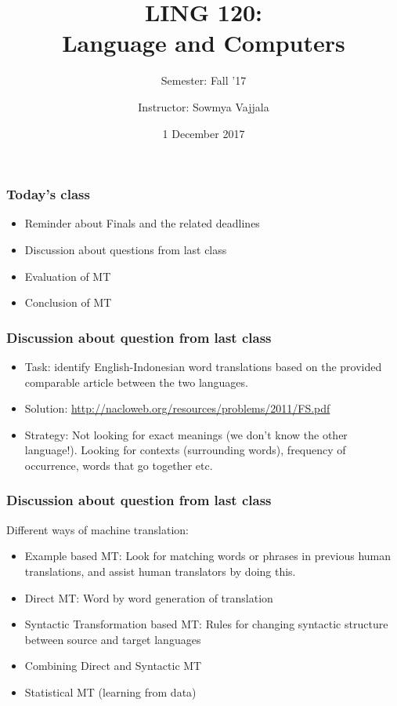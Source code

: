 \documentclass{beamer}
\author[Sowmya Vajjala]{Instructor: Sowmya Vajjala}
\title[LING 120]{LING 120: \\ Language and Computers}
\subtitle{Semester: Fall '17}
\date{1 December 2017}
\institute{Iowa State University, USA}
\begin{document}
\begin{frame}\titlepage
\end{frame}


\begin{frame}
\frametitle{Today's class}
\begin{itemize}
\item Reminder about Finals and the related deadlines
\item Discussion about questions from last class
\item Evaluation of MT
\item Conclusion of MT
\end{itemize}
\end{frame}

\begin{frame}
\frametitle{Discussion about question from last class}
\begin{itemize}
\item Task: identify English-Indonesian word translations based on the provided comparable article between the two languages.
\item Solution: \url{http://nacloweb.org/resources/problems/2011/FS.pdf}
\item Strategy: Not looking for exact meanings (we don't know the other language!). Looking for contexts (surrounding words), frequency of occurrence, words that go together etc.
\end{itemize}
\end{frame}

\begin{frame}
\frametitle{Discussion about question from last class}
Different ways of machine translation:
\begin{itemize}
\item Example based MT: Look for matching words or phrases in previous human translations, and assist human translators by doing this. 
\item Direct MT: Word by word generation of translation
\item Syntactic Transformation based MT: Rules for changing syntactic structure between source and target languages
\item Combining Direct and Syntactic MT
\item Statistical MT (learning from data)
\end{itemize}
\end{frame}
\end{document}
